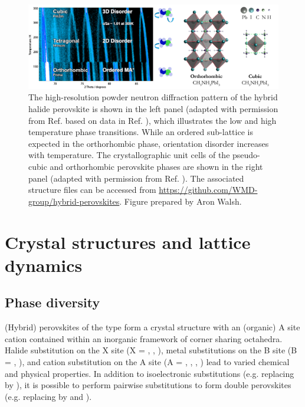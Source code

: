 \begin{figure}
\includegraphics[width=1.0\columnwidth]{./figures/ch2/f1.png}
\caption[ powder neutron diffraction pattern and crystallographic unit cells]{
The high-resolution powder neutron diffraction pattern of the hybrid halide perovskite  is shown in the left panel (adapted with permission from Ref. \autocite{Frost2016a} based on data in Ref. \autocite{Weller2015}), which illustrates the low and high temperature phase transitions. While an ordered  sub-lattice is expected in the orthorhombic phase, orientation disorder increases with temperature. 
The crystallographic unit cells of the pseudo-cubic and orthorhombic perovskite phases are shown in the right panel (adapted with permission from Ref. \autocite{Brivio2015a}). The associated structure files can be accessed from \url{https://github.com/WMD-group/hybrid-perovskites}. Figure prepared by Aron Walsh.
}
\label{fig1}
\end{figure}

\section{Crystal structures and lattice dynamics} 

\subsection{Phase diversity}
(Hybrid) perovskites of the type  form a crystal structure with an (organic) A site cation contained within an inorganic framework  of corner sharing octahedra. 
Halide substitution on the X site (X = , , ), metal substitutions on the B site (B = , ), and cation substitution on the A site (A = , , , ) lead to varied chemical and physical properties.\autocite{Mitzi2001,Mitzi2004a}
In addition to isoelectronic substitutions (e.g. replacing  by ), it is possible to perform pairwise substitutions to form double perovskites (e.g. replacing  by  and ).\autocite{Savory2016,Volonakis2016}

